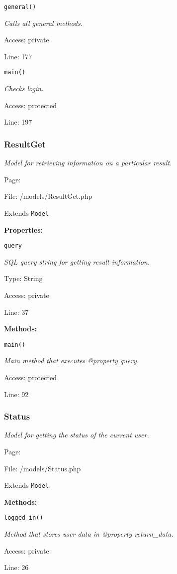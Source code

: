 \texttt{general()}

{\scriptsize
\textit{Calls all general methods.}

Access: private

Line: 177

}

\texttt{main()}

{\scriptsize
\textit{Checks login.}

Access: protected

Line: 197

}

\subsubsection{ResultGet}\label{ResultGet.php.doc}
\textit{Model for retrieving information on a particular result.}

Page: \pageref{ResultGet.php}

File: /models/ResultGet.php

Extends \texttt{Model}

\textbf{Properties:}

\texttt{query}

{\scriptsize
\textit{SQL query string for getting result information.}

Type: String

Access: private

Line: 37

}
\textbf{Methods:}

\texttt{main()}

{\scriptsize
\textit{Main method that executes @property query.}

Access: protected

Line: 92

}

\subsubsection{Status}\label{Status.php.doc}
\textit{Model for getting the status of the current user.}

Page: \pageref{Status.php}

File: /models/Status.php

Extends \texttt{Model}

\textbf{Methods:}

\texttt{logged\_in()}

{\scriptsize
\textit{Method that stores user data in @property return\_data.}

Access: private

Line: 26

}

